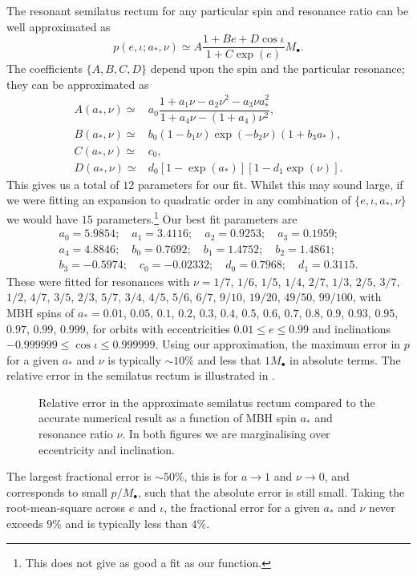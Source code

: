 The resonant semilatus rectum for any particular spin and resonance ratio can be well approximated as
\begin{equation}
p(e,\iota;a_\ast,\nu) \simeq A\dfrac{1 + B e + D \cos\iota}{1 + C\exp(e)} M_\bullet.
\end{equation}
The coefficients $\{A,B,C,D\}$ depend upon the spin and the particular resonance; they can be approximated as
\begin{align} 
A(a_\ast,\nu) \simeq {} & a_0\dfrac{1 + a_1\nu - a_2 \nu^2 - a_3 \nu a_\ast^2}{1 + a_4\nu - (1 + a_4)\nu^2}, \\
B(a_\ast,\nu) \simeq {} & b_0(1 - b_1\nu)\exp(-b_2\nu)(1 + b_3 a_\ast), \\
C(a_\ast,\nu) \simeq {} & c_0, \\
D(a_\ast,\nu) \simeq {} & d_0\left[1 - \exp(a_\ast)\right]\left[1 - d_1\exp(\nu)\right].
\end{align}
This gives us a total of $12$ parameters for our fit. Whilst this may sound large, if we were fitting an expansion to quadratic order in any combination of $\{e,\iota,a_\ast,\nu\}$ we would have $15$ parameters.\footnote{This does not give as good a fit as our function.} Our best fit parameters are
\begin{equation}
\begin{array}{c}
a_0 = 5.9854; \quad a_1 = 3.4116; \quad a_2 = 0.9253; \quad a_3 = 0.1959; \\
a_4 = 4.8846; \quad b_0 = 0.7692; \quad b_1 = 1.4752; \quad b_2 = 1.4861; \\
b_3 = -0.5974; \quad c_0 = -0.02332; \quad d_0 = 0.7968; \quad d_1 = 0.3115.\end{array}
\end{equation} 
These were fitted for resonances with $\nu = 1/7$, $1/6$, $1/5$, $1/4$, $2/7$, $1/3$, $2/5$, $3/7$, $1/2$, $4/7$, $3/5$, $2/3$, $5/7$, $3/4$, $4/5$, $5/6$, $6/7$, $9/10$, $19/20$, $49/50$, $99/100$, with MBH spins of $a_\ast = 0.01$, $0.05$, $0.1$, $0.2$, $0.3$, $0.4$, $0.5$, $0.6$, $0.7$, $0.8$, $0.9$, $0.93$, $0.95$, $0.97$, $0.99$, $0.999$, for orbits with eccentricities $0.01 \leq e \leq 0.99$ and inclinations $-0.999999 \leq \cos\iota \leq 0.999999$. Using our approximation, the maximum error in $p$ for a given $a_\ast$ and $\nu$ is typically $\sim10\%$ and less that $1 M_\bullet$ in absolute terms. The relative error in the semilatus rectum is illustrated in . 
\begin{figure}%
\centering
  \quad {}
\caption{Relative error in the approximate semilatus rectum compared to the accurate numerical result as a function of MBH spin $a_\ast$ and resonance ratio $\nu$. In both figures we are marginalising over eccentricity and inclination.}\label{fig:p-error}
\end{figure}
The largest fractional error is $\sim50\%$, this is for $a \rightarrow 1$ and $\nu \rightarrow 0$, and corresponds to small $p/M_\bullet$, such that the absolute error is still small. Taking the root-mean-square across $e$ and $\iota$, the fractional error for a given $a_\ast$ and $\nu$ never exceeds $9\%$ and is typically less than $4\%$.


